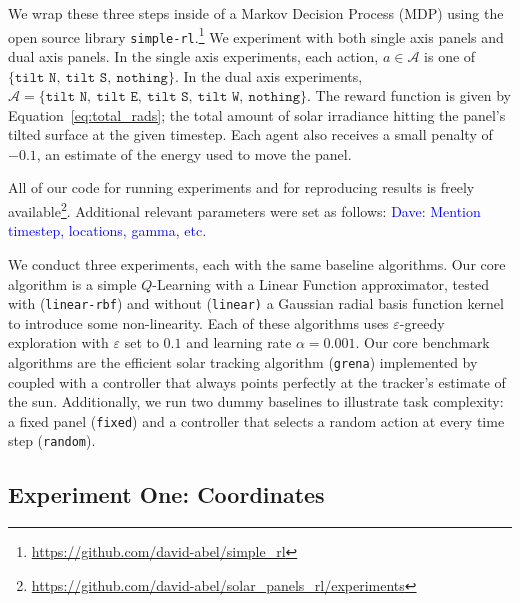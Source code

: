 \documentclass[11pt]{article}
\newcommand{\dnote}[1]{\textcolor{blue}{Dave: #1}}
\newcommand{\mc}{\mathcal}
\begin{document}
We wrap these three steps inside of a Markov Decision Process (MDP) using the open source library \texttt{simple-rl}.\footnote{\url{https://github.com/david-abel/simple_rl}} We experiment with both single axis panels and dual axis panels. In the single axis experiments, each action, $a \in \mc{A}$ is one of $\{\texttt{tilt N},\ \texttt{tilt S},\ \texttt{nothing}\}$. In the dual axis experiments, $\mc{A} = \{\texttt{tilt N},\ \texttt{tilt E},\ \texttt{tilt S},\ \texttt{tilt W},\ \texttt{nothing}\}$. The reward function is given by Equation~\ref{eq:total_rads}; the total amount of solar irradiance hitting the panel's tilted surface at the given timestep. Each agent also receives a small penalty of $-0.1$, an estimate of the energy used to move the panel.

All of our code for running experiments and for reproducing results is freely available\footnote{\url{https://github.com/david-abel/solar_panels_rl/experiments}}. Additional relevant parameters were set as follows: \dnote{Mention timestep, locations, gamma, etc.}

We conduct three experiments, each with the same baseline algorithms. Our core algorithm is a simple $Q$-Learning with a Linear Function approximator, tested with (\texttt{linear-rbf}) and without (\texttt{linear)} a Gaussian radial basis function kernel to introduce some non-linearity. Each of these algorithms uses $\varepsilon$-greedy exploration with $\varepsilon$ set to $0.1$ and learning rate $\alpha = 0.001$. Our core benchmark algorithms are the efficient solar tracking algorithm (\texttt{grena}) implemented by~\citet{Grena2008} coupled with a controller that always points perfectly at the tracker's estimate of the sun. Additionally, we run two dummy baselines to illustrate task complexity: a fixed panel (\texttt{fixed}) and a controller that selects a random action at every time step (\texttt{random}).



\subsection{Experiment One: Coordinates}
\end{document}
